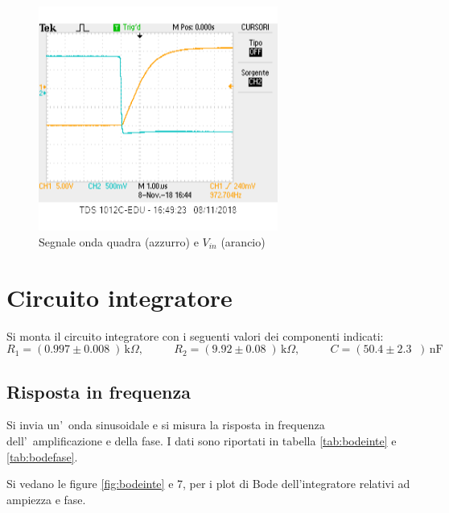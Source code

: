 \documentclass[10pt,a4paper]{article}
\newcommand{\exn}{\phantom{xxx}}
\begin{document}
\begin{figure}[h]
		\begin{center}
			
			\includegraphics[width=0.7\textwidth]{slewrate}
			\caption{\small Segnale onda quadra (azzurro) e $V_{in}$ (arancio)}
			\label{fig:Slew  Rate}
		\end{center}
	\end{figure}

	\section{Circuito integratore}
	Si monta il circuito integratore con i seguenti valori  dei componenti indicati: 
	\[
	R_1 = (0.997 \pm 0.008 \;) \,\mathrm{k}\Omega, \:\:\;\:\exn 
	R_2 = (9.92 \pm 0.08 \;) \,\mathrm{k}\Omega, \:\:\;\:\exn 
	C = (50.4 \pm 2.3 \;\;)\,\mathrm{nF}
	\]
	
	\subsection{Risposta in frequenza}
	
	Si invia un'~onda sinusoidale e si misura la risposta in frequenza dell'~amplificazione e della fase.
	I dati sono riportati in tabella \ref{tab:bodeinte} e \ref{tab:bodefase}.

         Si vedano le figure \ref{fig:bodeinte} e 7, per i plot di Bode dell'integratore relativi ad ampiezza e fase.
\end{document}
